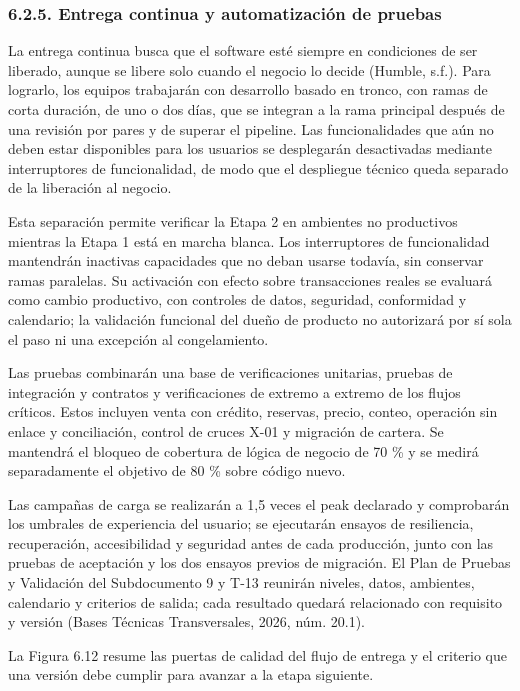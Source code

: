 \documentclass[11pt]{article}
\begin{document}
\subsubsection{6.2.5. Entrega continua y automatización de pruebas}\label{6-2-5-entrega-continua-y-automatizacion-de-pruebas}

La entrega continua busca que el software esté siempre en condiciones de ser liberado, aunque se libere solo cuando el negocio lo decide (Humble, s.f.). Para lograrlo, los equipos trabajarán con desarrollo basado en tronco, con ramas de corta duración, de uno o dos días, que se integran a la rama principal después de una revisión por pares y de superar el pipeline. Las funcionalidades que aún no deben estar disponibles para los usuarios se desplegarán desactivadas mediante interruptores de funcionalidad, de modo que el despliegue técnico queda separado de la liberación al negocio.

Esta separación permite verificar la Etapa 2 en ambientes no productivos
mientras la Etapa 1 está en marcha blanca. Los interruptores de
funcionalidad mantendrán inactivas capacidades que no deban usarse
todavía, sin conservar ramas paralelas. Su activación con efecto sobre
transacciones reales se evaluará como cambio productivo, con controles
de datos, seguridad, conformidad y calendario; la validación funcional
del dueño de producto no autorizará por sí sola el paso ni una excepción
al congelamiento.

Las pruebas combinarán una base de verificaciones unitarias, pruebas de
integración y contratos y verificaciones de extremo a extremo de los
flujos críticos. Estos incluyen venta con crédito, reservas, precio,
conteo, operación sin enlace y conciliación, control de cruces X-01 y
migración de cartera. Se mantendrá el bloqueo de cobertura de lógica de
negocio de 70 \% y se medirá separadamente el objetivo de 80 \% sobre
código nuevo.

Las campañas de carga se realizarán a 1,5 veces el peak declarado y
comprobarán los umbrales de experiencia del usuario; se ejecutarán
ensayos de resiliencia, recuperación, accesibilidad y seguridad antes de
cada producción, junto con las pruebas de aceptación y los dos ensayos
previos de migración. El Plan de Pruebas y Validación del Subdocumento 9
y T-13 reunirán niveles, datos, ambientes, calendario y criterios de
salida; cada resultado quedará relacionado con requisito y versión
(Bases Técnicas Transversales, 2026, núm. 20.1).

La Figura 6.12 resume las puertas de calidad del flujo de entrega y el
criterio que una versión debe cumplir para avanzar a la etapa siguiente.
\end{document}
